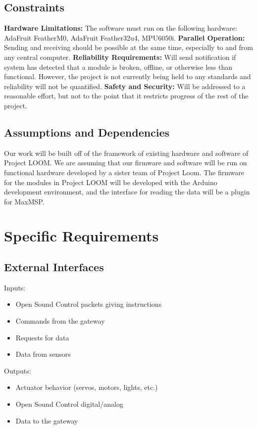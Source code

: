 \documentclass[onecolumn, draftclsnofoot,10pt, compsoc]{IEEEtran}
\begin{document}
	\subsection{Constraints}
		\textbf{Hardware Limitations:} The software must run on the following hardware: AdaFruit FeatherM0, AdaFruit Feather32u4, MPU6050i. \newline
		\textbf{Parallel Operation:} Sending and receiving should be possible at the same time, especially to and from any central computer. \newline
		\textbf{Reliability Requirements:} Will send notification if system has detected that a module is broken, offline, or otherwise less than functional. However, the project is not currently being held to any standards and reliability will not be quantified. \newline
		\textbf{Safety and Security:} Will be addressed to a reasonable effort, but not to the point that it restricts progress of the rest of the project. \newline
	
	\subsection{Assumptions and Dependencies}
	Our work will be built off of the framework of existing hardware and software of Project LOOM. We are assuming that our firmware and software will be run on functional hardware developed by a sister team of Project Loom. The firmware for the modules in Project LOOM will be developed with the Arduino development environment, and the interface for reading the data will be a plugin for MaxMSP.

\section{Specific Requirements}
	\subsection{External Interfaces}
	Inputs: 
	\begin{itemize}
		\item Open Sound Control packets giving instructions
		\item Commands from the gateway
		\item Requests for data
		\item Data from sensors
	\end{itemize}
	Outputs: 
	\begin{itemize}
		\item Actuator behavior (servos, motors, lights, etc.)
		\item Open Sound Control digital/analog 
		\item Data to the gateway
	\end{itemize}
	
\end{document}
